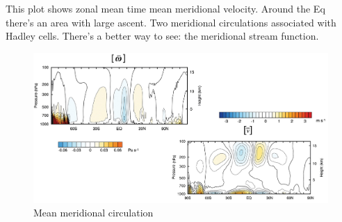 This plot shows zonal mean time mean meridional velocity. Around the Eq there’s an area with large ascent. Two meridional circulations associated with Hadley cells. There’s a better way to see: the meridional stream function. 
\begin{figure}[h]
    \centering
    \includegraphics[width=0.5\linewidth]{uploads/mean meridional circulation.png}
    \caption{Mean meridional circulation}
    \label{fig:mean meridional circ}
\end{figure}
